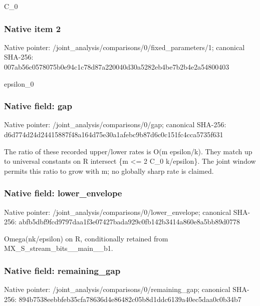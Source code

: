 \documentclass[10pt,a4paper]{article}
\begin{document}
\begingroup\raggedright\sloppy C\_\allowbreak{}0\par\endgroup

\subsubsection{Native item 2}
Native pointer: /joint\_\allowbreak{}analysis/comparisons/0/fixed\_\allowbreak{}parameters/1; canonical SHA-256: 007ab56c0578075b0e94c1c78d87a220040d30a5282eb4be7b2b4e2a54800403

\begingroup\raggedright\sloppy epsilon\_\allowbreak{}0\par\endgroup

\subsubsection{Native field: gap}
Native pointer: /joint\_\allowbreak{}analysis/comparisons/0/gap; canonical SHA-256: d6d774d24d24415887f48a164d75e30a1afebc9b87d6c0c151fc4cca5735f631

\begingroup\raggedright\sloppy The ratio of these recorded upper/\allowbreak{}lower rates is O(m epsilon/\allowbreak{}k). They match up to universal constants on R intersect \{m <=\allowbreak{} 2 C\_\allowbreak{}0 k/\allowbreak{}epsilon\}. The joint window permits this ratio to grow with m;\allowbreak{} no globally sharp rate is claimed.\par\endgroup

\subsubsection{Native field: lower\_\allowbreak{}envelope}
Native pointer: /joint\_\allowbreak{}analysis/comparisons/0/lower\_\allowbreak{}envelope; canonical SHA-256: abfb5dbf9fcd9797daa1f3e07427bada929c0fb142b3414a860e8a5bb89d0778

\begingroup\raggedright\sloppy Omega(nk/\allowbreak{}epsilon) on R,\allowbreak{} conditionally retained from MX\_\allowbreak{}S\_\allowbreak{}stream\_\allowbreak{}bits\_\allowbreak{}\_\allowbreak{}main\_\allowbreak{}\_\allowbreak{}b1.\par\endgroup

\subsubsection{Native field: remaining\_\allowbreak{}gap}
Native pointer: /joint\_\allowbreak{}analysis/comparisons/0/remaining\_\allowbreak{}gap; canonical SHA-256: 894b7538eebbfeb35cfa78636d4e86482c05b8d1ddc6139a40ec5daa0c0b34b7
\end{document}
